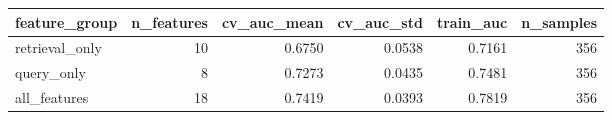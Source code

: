 \begin{tabular}{lrrrrr}
\toprule
feature_group & n_features & cv_auc_mean & cv_auc_std & train_auc & n_samples \\
\midrule
retrieval_only & 10 & 0.6750 & 0.0538 & 0.7161 & 356 \\
query_only & 8 & 0.7273 & 0.0435 & 0.7481 & 356 \\
all_features & 18 & 0.7419 & 0.0393 & 0.7819 & 356 \\
\bottomrule
\end{tabular}
